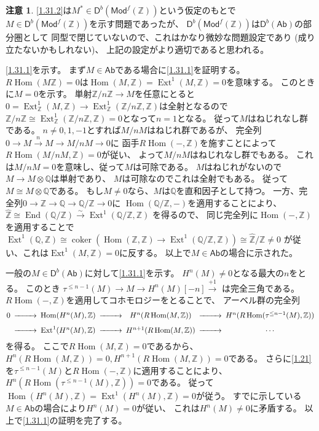 \documentclass[uplatex,dvipdfmx]{jsarticle}
\makeatletter
\theoremstyle{definition}
\newtheorem*{rem*}{注意}
\renewenvironment{proof}[1][\proofname]{
  \pushQED{\qed}%
  \normalfont \topsep6\p@\@plus6\p@\relax
  \trivlist
  \item[\hskip\labelsep
    #1\@addpunct{\textbf{.}}]\ignorespaces
}{%
  \popQED\endtrivlist\@endpefalse
}
\providecommand{\proofname}{証明}
\DeclareMathOperator{\Hom}{\mathrm{Hom}}
\DeclareMathOperator{\End}{\mathrm{End}}
\DeclareMathOperator{\Ext}{\mathrm{Ext}}
\DeclareMathOperator{\coker}{\mathrm{coker}}
\newcommand{\Ab}{\mathsf{Ab}}
\newcommand{\Mod}{\mathsf{Mod}}
\newcommand{\sfD}{\mathsf{D}}
\newcommand\Q{\mathbb{Q}}
\newcommand\Z{\mathbb{Z}}
\makeatother
\begin{document}
\begin{rem*}
  \ref{1.31.2}は\(M^*\in \sfD^b(\Mod^f(\Z))\)という仮定のもとで
  \(M\in \sfD^b(\Mod^f(\Z))\)を示す問題であったが、
  \(\sfD^b(\Mod^f(\Z))\)は\(\sfD^b(\Ab)\)の部分圏として
  同型で閉じていないので、これはかなり微妙な問題設定であり
  (成り立たないかもしれない)、
  上記の設定がより適切であると思われる。
\end{rem*}

\begin{proof}
  \ref{1.31.1}を示す。
  まず\(M\in \Ab\)である場合に\ref{1.31.1}を証明する。
  \(R\Hom(M\Z)=0\)は\(\Hom(M,\Z) = \Ext^1(M,\Z) = 0\)を意味する。
  このときに\(M=0\)を示す。
  単射\(\Z/n\Z \to M\)を任意にとると
  \(0 = \Ext^1_{\Z}(M,\Z) \to \Ext^1_{\Z}(\Z/n\Z,\Z)\)は全射となるので
  \(\Z/n\Z \cong \Ext^1_{\Z}(\Z/n\Z,\Z) = 0\)となって\(n=1\)となる。
  従って\(M\)はねじれなし群である。
  \(n\neq 0,1,-1\)とすれば\(M/nM\)はねじれ群であるが、
  完全列\(0\to M\xrightarrow{n} M \to M/nM\to 0\)に
  函手\(R\Hom(-,\Z)\)を施すことによって\(R\Hom(M/nM,\Z) = 0\)が従い、
  よって\(M/nM\)はねじれなし群でもある。
  これは\(M/nM=0\)を意味し、従って\(M\)は可除である。
  \(M\)はねじれがないので\(M\to M\otimes \Q\)は単射であり、
  \(M\)は可除なのでこれは全射でもある。
  従って\(M\cong M\otimes \Q\)である。
  もし\(M\neq 0\)なら、\(M\)は\(\Q\)を直和因子として持つ。
  一方、完全列\(0\to \Z\to \Q\to \Q/\Z\to 0\)に
  \(\Hom(\Q/\Z,-)\)を適用することにより、
  \(\hat{\Z} \cong \End(\Q/\Z) \xrightarrow{\sim}\Ext^1(\Q/\Z,\Z)\)
  を得るので、
  同じ完全列に\(\Hom(-,\Z)\)を適用することで
  \(\Ext^1(\Q,\Z) \cong \coker(\Hom(\Z,\Z) \to
  \Ext^1(\Q/\Z,\Z)) \cong \hat{\Z}/\Z \neq 0\)
  が従い、これは\(\Ext^1(M,\Z) = 0\)に反する。
  以上で\(M\in \Ab\)の場合に示された。

  一般の\(M\in \sfD^b(\Ab)\)に対して\ref{1.31.1}を示す。
  \(H^n(M) \neq 0\)となる最大の\(n\)をとる。
  このとき
  \(\tau^{\leq n-1}(M) \to M \to H^n(M)[-n]\xrightarrow{+1}\)
  は完全三角である。
  \(R\Hom(-,\Z)\)を適用してコホモロジーをとることで、
  アーベル群の完全列
  \[
  \begin{CD}
    0 @>>> \Hom(H^n(M),\Z)
    @>>> H^n(R\Hom(M,\Z)) @>>> H^n(R\Hom(\tau^{\leq n-1}(M),\Z)) \\
    @>>> \Ext^1(H^n(M),\Z) @>>> H^{n+1}(R\Hom(M,\Z)) @>>> \cdots
  \end{CD}
  \]
  を得る。
  ここで\(R\Hom(M,\Z)=0\)であるから、
  \(H^n(R\Hom(M,\Z)) = 0, H^{n+1}(R\Hom(M,\Z)) = 0\)である。
  さらに\autoref{1.21}を\(\tau^{\leq n-1}(M)\)と\(R\Hom(-,\Z)\)に適用することにより、
  \(H^n(R\Hom(\tau^{\leq n-1}(M),\Z)) = 0\)である。
  従って\(\Hom(H^n(M),\Z)=\Ext^1(H^n(M),\Z)=0\)が従う。
  すでに示している\(M\in \Ab\)の場合により\(H^n(M)=0\)が従い、
  これは\(H^n(M)\neq 0\)に矛盾する。
  以上で\ref{1.31.1}の証明を完了する。


\end{proof}
\end{document}
